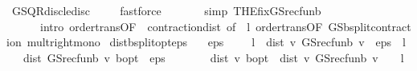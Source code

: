\begin{isabellebody}
%
\isatagproof
{}\isamarkupfalse%
\ GS{\isacharunderscore}{\kern0pt}QR{\isacharunderscore}{\kern0pt}disc{\isacharunderscore}{\kern0pt}le{\isacharunderscore}{\kern0pt}disc\ \isanewline
\ \ \isamarkupfalse%
\ {\isacharparenleft}{\kern0pt}fastforce\ \isanewline
\ \ \ \ \ \ simp{\isacharcolon}{\kern0pt}\ THE{\isacharunderscore}{\kern0pt}fix{\isacharunderscore}{\kern0pt}GS{\isacharunderscore}{\kern0pt}rec{\isacharunderscore}{\kern0pt}fun\isactrlsub b\ \isanewline
\ \ \ \ \ \ intro{\isacharcolon}{\kern0pt}\ order{\isachardot}{\kern0pt}trans{\isacharbrackleft}{\kern0pt}OF\ {\isacharunderscore}{\kern0pt}\ contraction{\isacharunderscore}{\kern0pt}dist{\isacharcomma}{\kern0pt}\ of\ {\isacharunderscore}{\kern0pt}\ l{\isacharbrackright}{\kern0pt}\ order{\isachardot}{\kern0pt}trans{\isacharbrackleft}{\kern0pt}OF\ GS{\isachardot}{\kern0pt}{\isasymL}\isactrlsub b{\isacharunderscore}{\kern0pt}split{\isacharunderscore}{\kern0pt}contraction{\isacharbrackright}{\kern0pt}\ mult{\isacharunderscore}{\kern0pt}right{\isacharunderscore}{\kern0pt}mono{\isacharparenright}{\kern0pt}{\isacharplus}{\kern0pt}%
\endisatagproof
{\isafoldproof}%
%
\isadelimproof
\isanewline
%
\endisadelimproof
\isanewline
{}\isamarkupfalse%
\ dist{\isacharunderscore}{\kern0pt}{\isasymL}\isactrlsub b{\isacharunderscore}{\kern0pt}split{\isacharunderscore}{\kern0pt}opt{\isacharunderscore}{\kern0pt}eps{\isacharcolon}{\kern0pt}\isanewline
\ \ \ {\isachardoublequoteopen}eps\ {\isachargreater}{\kern0pt}\ {}{\isachardoublequoteclose}\ {\isachardoublequoteopen}{}\ {\isacharasterisk}{\kern0pt}\ l\ {\isacharasterisk}{\kern0pt}\ dist\ v\ {\isacharparenleft}{\kern0pt}GS{\isacharunderscore}{\kern0pt}rec{\isacharunderscore}{\kern0pt}fun\isactrlsub b\ v{\isacharparenright}{\kern0pt}\ {\isacharless}{\kern0pt}\ eps\ {\isacharasterisk}{\kern0pt}\ {\isacharparenleft}{\kern0pt}{}{\isacharminus}{\kern0pt}l{\isacharparenright}{\kern0pt}{\isachardoublequoteclose}\isanewline
\ \ \ {\isachardoublequoteopen}dist\ {\isacharparenleft}{\kern0pt}GS{\isacharunderscore}{\kern0pt}rec{\isacharunderscore}{\kern0pt}fun\isactrlsub b\ v{\isacharparenright}{\kern0pt}\ {\isasymnu}\isactrlsub b{\isacharunderscore}{\kern0pt}opt\ {\isacharless}{\kern0pt}\ eps\ {\isacharslash}{\kern0pt}\ {}{\isachardoublequoteclose}\isanewline
%
\isadelimproof
%
\endisadelimproof
%
\isatagproof
{}\isamarkupfalse%
\ {\isacharminus}{\kern0pt}\isanewline
\ \ \isamarkupfalse%
\ {\isachardoublequoteopen}dist\ v\ {\isasymnu}\isactrlsub b{\isacharunderscore}{\kern0pt}opt\ {\isasymle}\ dist\ v\ {\isacharparenleft}{\kern0pt}GS{\isacharunderscore}{\kern0pt}rec{\isacharunderscore}{\kern0pt}fun\isactrlsub b\ v{\isacharparenright}{\kern0pt}\ {\isacharslash}{\kern0pt}\ {\isacharparenleft}{\kern0pt}{}\ {\isacharminus}{\kern0pt}\ l{\isacharparenright}{\kern0pt}{\isachardoublequoteclose}\isanewline

\end{isabellebody}
